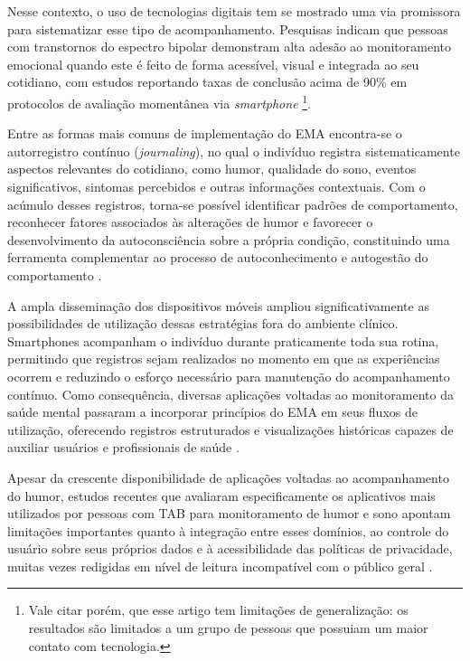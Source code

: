 Nesse contexto, o uso de tecnologias digitais tem se mostrado uma via
promissora para sistematizar esse tipo de acompanhamento. Pesquisas indicam
que pessoas com transtornos do espectro bipolar demonstram alta adesão ao
monitoramento emocional quando este é feito de forma acessível, visual e
integrada ao seu cotidiano, com estudos reportando taxas de conclusão acima
de 90\% em protocolos de avaliação momentânea
via \textit{smartphone} \citep{Ryan2020} \footnote{
  Vale citar porém, que esse artigo tem limitações de generalização:
  os resultados são limitados a um grupo de pessoas que possuiam um maior
  contato com tecnologia.
}.

Entre as formas mais comuns de implementação do EMA encontra-se o
autorregistro contínuo (\textit{journaling}), no qual o indivíduo
registra sistematicamente aspectos relevantes do cotidiano, como
humor, qualidade do sono, eventos significativos, sintomas percebidos
e outras informações contextuais. Com o acúmulo desses registros,
torna-se possível identificar padrões de comportamento, reconhecer fatores
associados às alterações de humor e favorecer o desenvolvimento da
autoconsciência sobre a própria condição, constituindo uma ferramenta
complementar ao processo de autoconhecimento e autogestão do
comportamento \citep{Melton2013}.

A ampla disseminação dos dispositivos móveis ampliou significativamente
as possibilidades de utilização dessas estratégias fora do ambiente
clínico. Smartphones acompanham o indivíduo durante praticamente toda
sua rotina, permitindo que registros sejam realizados no momento em que
as experiências ocorrem e reduzindo o esforço necessário para manutenção
do acompanhamento contínuo. Como consequência, diversas aplicações
voltadas ao monitoramento da saúde mental passaram a incorporar princípios
do EMA em seus fluxos de utilização, oferecendo registros estruturados
e visualizações históricas capazes de auxiliar usuários e profissionais
de saúde \citep{Faurholt:2016}.

Apesar da crescente disponibilidade de aplicações voltadas ao acompanhamento
do humor, estudos recentes que avaliaram especificamente os aplicativos mais
utilizados por pessoas com TAB para monitoramento de humor e sono apontam
limitações importantes quanto à integração entre esses domínios, ao controle
do usuário sobre seus próprios dados e à acessibilidade das políticas de
privacidade, muitas vezes redigidas em nível de leitura incompatível com o
público geral \citep{Morton2022}.

